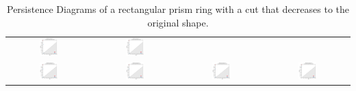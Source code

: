 \documentclass[ma]{uncgdissertationexp}
\theoremstyle{plain}
\theoremstyle{definition}
\theoremstyle{remark}
\begin{document}
\begin{table}[H]
\begin{center}
\begin{tabular}{cccc}
         \includegraphics[width=0.24\textwidth]{Final Run, (rect prism ring 10 mm cut) persdia.png} & 
         \includegraphics[width=0.24\textwidth]{Final Run, (rect prism ring 05 mm cut) persdia.png} \\ 
         \includegraphics[width=0.24\textwidth]{Final Run, (rect prism ring 03 mm cut) persdia.png} &
         \includegraphics[width=0.24\textwidth]{Final Run, (rect prism ring 02 mm cut) persdia.png} &
         \includegraphics[width=0.24\textwidth]{Final Run, (rect prism ring 01 mm cut) persdia.png} &
         \includegraphics[width=0.24\textwidth]{Final Run, (rect prism ring 00 mm cut) persdia.png} \\
    \end{tabular}
    \end{center}
    \caption{Persistence Diagrams of a rectangular prism ring with a cut that decreases to the original shape.}
    \label{fig:rect_prism_ring_persdia_table}
\end{table}
\end{document}
